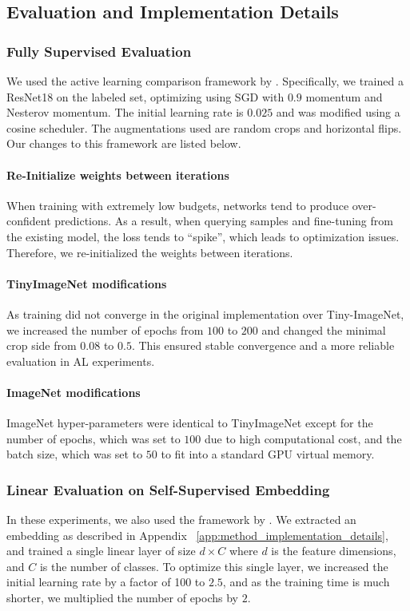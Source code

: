 \documentclass{article}
\begin{document}
\subsection{Evaluation and Implementation Details}
\label{app:eval_impl_details}

\subsubsection{Fully Supervised Evaluation}
We used the active learning comparison framework by \citet{Munjal2020TowardsRA}. 
Specifically, we trained a ResNet18 on the labeled set, optimizing using SGD with $0.9$ momentum and Nesterov momentum. The initial learning rate is $0.025$ and was modified using a cosine scheduler. The augmentations used are random crops and horizontal flips. Our changes to this framework are listed below.
\paragraph{Re-Initialize weights between iterations}
When training with extremely low budgets, networks tend to produce over-confident predictions. As a result, when querying samples and fine-tuning from the existing model, the loss tends to ``spike'', which leads to optimization issues. Therefore, we re-initialized the weights between iterations.

\paragraph{TinyImageNet modifications}
As training did not converge in the original implementation over Tiny-ImageNet, we increased the number of epochs from $100$ to $200$ and changed the minimal crop side from $0.08$ to $0.5$. This ensured stable  convergence and a more reliable evaluation in AL experiments.

\paragraph{ImageNet modifications}
ImageNet hyper-parameters were identical to TinyImageNet except for the number of epochs, which was set to $100$ due to high computational cost, and the batch size, which was set to $50$ to fit into a standard GPU virtual memory.


\subsubsection{Linear Evaluation on Self-Supervised Embedding}
\label{app:linear_eval_implementation}
In these experiments, we also used the framework by \citet{Munjal2020TowardsRA}.
We extracted an embedding as described in Appendix ~\ref{app:method_implementation_details}, and trained a single linear layer of size $d \times C$ where $d$ is the feature dimensions, and $C$ is the number of classes. To optimize this single layer, we increased the initial learning rate by a factor of 100 to $2.5$, and as the training time is much shorter, we multiplied the number of epochs by $2$.
\end{document}
